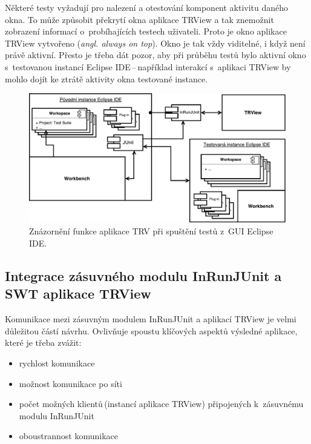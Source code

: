     Některé testy vyžadují pro nalezení a otestování komponent aktivitu daného okna. To může způsobit překrytí okna aplikace TRView a tak znemožnit zobrazení informací o~probíhajících testech uživateli. Proto je okno aplikace TRView vytvořeno (\emph{angl. always on top}). Okno je tak vždy viditelné, i když není právě aktivní. Přesto je třeba dát pozor, aby při průběhu testů bylo aktivní okno s~testovanou instancí Eclipse IDE\,--\,například interakcí s~aplikaci TRView by mohlo dojít ke ztrátě aktivity okna testované instance.

    \begin{figure}
      \includegraphics[width=\textwidth, center]{obrazky-figures/TRV_run_from_gui.pdf}
      \caption{Znázornění funkce aplikace TRV při spuštění testů z~GUI Eclipse IDE.}
      \label{fig:TRV_run_from_gui}
    \end{figure}

    \subsection{Integrace zásuvného modulu InRunJUnit a SWT aplikace TRView}
    Komunikace mezi zásuvným modulem InRunJUnit a aplikací TRView je velmi důležitou částí návrhu. Ovlivňuje spoustu klíčových aspektů výsledné aplikace, které je třeba zvážit:
    \begin{itemize}
     \item rychlost komunikace
     \item možnost komunikace po síti
     \item počet možných klientů\,(instancí aplikace TRView) připojených k~zásuvnému modulu InRunJUnit
     \item oboustrannost komunikace
    \end{itemize}

